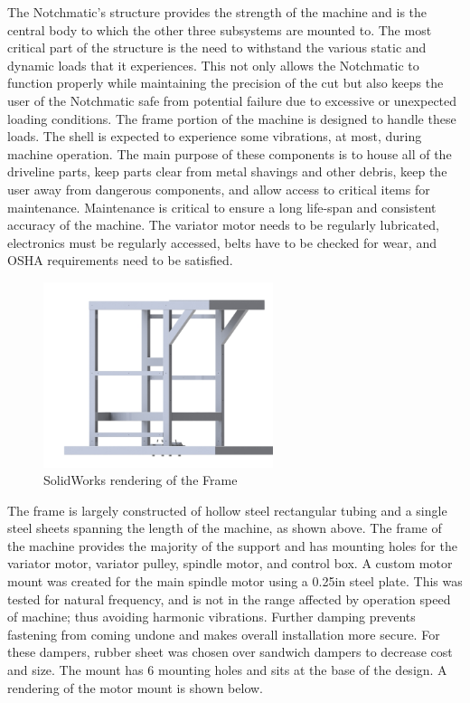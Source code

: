 The Notchmatic's structure provides the strength of the machine and is the central body to which the other three  subsystems are mounted to. The most critical part of the structure is the need to withstand the various static and dynamic loads that it experiences. This not only allows the Notchmatic to function properly while maintaining the precision of the cut but also keeps the user of the Notchmatic safe from potential failure due to excessive or unexpected loading conditions. The frame portion of the machine is designed to handle these loads. The shell is expected to experience some vibrations, at most, during machine operation. The main purpose of these components is to house all of the driveline parts, keep parts clear from metal shavings and other debris, keep the user away from dangerous components, and allow access to critical items for maintenance.  Maintenance is critical to ensure a long life-span and consistent accuracy of the machine. The variator motor needs to be regularly lubricated, electronics must be regularly accessed, belts have to be checked for wear, and OSHA requirements need to be satisfied. 

\begin{figure}[H]
    \centering
    \includegraphics[width=0.6\textwidth]{./fall-report pictures/Chapter2-MachineDescription/Frame}
    \caption{SolidWorks rendering of the Frame}
    \label{fig:Frame}
\end{figure}

The frame is largely constructed of hollow steel rectangular tubing and a single steel sheets spanning the length of the machine, as shown above.  The frame of the machine provides the majority of the support and has mounting holes for the variator motor, variator pulley, spindle motor, and control box. A custom  motor mount was created for the main spindle motor using a 0.25in steel plate. This was tested for natural frequency, and is not in the range affected by operation speed of machine; thus avoiding harmonic vibrations. Further damping prevents fastening from coming undone and makes overall installation more secure. For these dampers, rubber sheet was chosen over sandwich dampers to decrease cost and size. The mount has 6 mounting holes and sits at the base of the design. A rendering of the motor mount is shown below.

